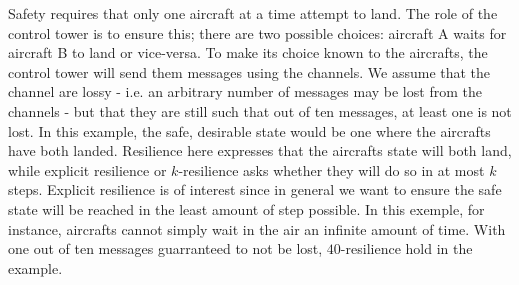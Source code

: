 Safety requires that only one aircraft at a time attempt to land. The role of the control tower is to ensure this;
there are two possible choices: aircraft A waits for aircraft B to land
or vice-versa. To make its choice known to the aircrafts, the control tower will send them messages using the channels. 
We assume that the channel are
lossy \-- i.e. an arbitrary number of messages may be lost from the channels \--  but that they are still such that out of ten messages, at least one is not lost.
In this example, the safe, desirable state would be one where the aircrafts have both landed. 
Resilience here expresses that the aircrafts state will both land, while explicit resilience or $k$-resilience asks whether they will do so in at most $k$ steps. 
Explicit resilience is of interest since in general we want to ensure the safe state will
be reached in
the least amount of step possible. 
In this exemple, for instance, aircrafts cannot simply wait in the air an infinite amount of time.
With one out of ten messages guarranteed to not be lost, $40$-resilience hold in the example.





